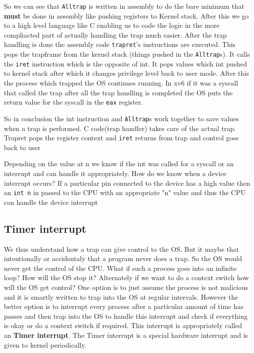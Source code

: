 \documentclass[12pt]{article}
\begin{document}
So we can see that \texttt{\texttt{Alltrap}} is written in assembly to do the bare minimum that \textbf{must} be done in assembly like pushing registers to Kernel stack. After this we go to a high level
language like C enabling us to code the logic in the more compliacted part of actually handling the trap much easier. 
After the trap handling is done the assembly code \texttt{trapret}'s instructions are executed. This pops the trapframe from the kernel stack (things pushed in the \texttt{Alltrap}s). It calls the \texttt{iret} instruction which is the opposite of int. It pops values which int pushed to kernel stack after which it changes privilege level back to user mode. After this the process which trapped the OS continues running. In xv6 if it was a syscall that called the trap after all the trap handling is completed the OS puts the return value for the 
syscall in the \texttt{eax} register.


So in conclusion the int instruction and \texttt{Alltrap}s work together to save values when a trap is performed. C code(trap handler) takes care of the actual trap. Trapret pops the register context and \texttt{iret} returns from trap and control goes back to user


Depending on the value at n we know if the int was called for a syscall or an interrupt and can handle it appropriately. How do we know when a device interrupt occurs?
If a particular pin connected to the device has a high value then an 
\texttt{int n} in passed to the CPU with an appropriate "n" value and thus the CPU can handle the device interrupt


\subsection{Timer interrupt}
\label{section:Timer}
We thus understand how a trap can give control to the OS. But it maybe that intentionally or accidentaly that a program never does a trap. So the OS would never get the control
of the CPU. What if such a process goes into an infinite loop? How will the OS stop it? Alternately if we want to do a context switch how will the OS get control? One option is to just assume the process
is not malicious and it is smartly written to trap into the OS at regular intervals. However the better option is to interrupt every process after a particular amount of time has passes and then 
trap into the OS to handle this interrupt and check if everything is okay or do a context switch if required. This interrupt is appropriately called an \textbf{Timer interrupt}. The Timer interrupt is a special hardware interrupt and is given to kernel periodically.
\end{document}
